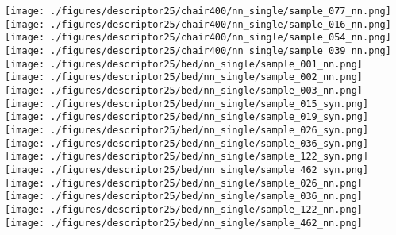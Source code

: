 \documentclass[10pt,twocolumn,letterpaper]{article}
\begin{document}
\begin{figure*}[h]
     \texttt{[image: ./figures/descriptor25/chair400/nn\_single/sample\_077\_nn.png]} \hspace{-3mm}
     \texttt{[image: ./figures/descriptor25/chair400/nn\_single/sample\_016\_nn.png]}
      \hspace{-3mm}
     \texttt{[image: ./figures/descriptor25/chair400/nn\_single/sample\_054\_nn.png]} \hspace{-3mm}
     \texttt{[image: ./figures/descriptor25/chair400/nn\_single/sample\_039\_nn.png]}     
      \\ 
	\texttt{[image: ./figures/descriptor25/bed/nn\_single/sample\_001\_nn.png]} \hspace{-1mm}
	\texttt{[image: ./figures/descriptor25/bed/nn\_single/sample\_002\_nn.png]} \hspace{-1mm}
	\texttt{[image: ./figures/descriptor25/bed/nn\_single/sample\_003\_nn.png]}  
	\texttt{[image: ./figures/descriptor25/bed/nn\_single/sample\_015\_syn.png]}  \hspace{-1mm}
	\texttt{[image: ./figures/descriptor25/bed/nn\_single/sample\_019\_syn.png]}  \hspace{-1mm}
    \texttt{[image: ./figures/descriptor25/bed/nn\_single/sample\_026\_syn.png]}  \hspace{-1mm}
    \texttt{[image: ./figures/descriptor25/bed/nn\_single/sample\_036\_syn.png]}  \hspace{-1mm}
    \texttt{[image: ./figures/descriptor25/bed/nn\_single/sample\_122\_syn.png]} \hspace{-1mm}
    \texttt{[image: ./figures/descriptor25/bed/nn\_single/sample\_462\_syn.png]}     
    \texttt{[image: ./figures/descriptor25/bed/nn\_single/sample\_026\_nn.png]}  \hspace{-1mm}
    \texttt{[image: ./figures/descriptor25/bed/nn\_single/sample\_036\_nn.png]}  \hspace{-1mm} 
    \texttt{[image: ./figures/descriptor25/bed/nn\_single/sample\_122\_nn.png]} \hspace{-1mm}
    \texttt{[image: ./figures/descriptor25/bed/nn\_single/sample\_462\_nn.png]}     
      \\

\end{figure*}
\end{document}
